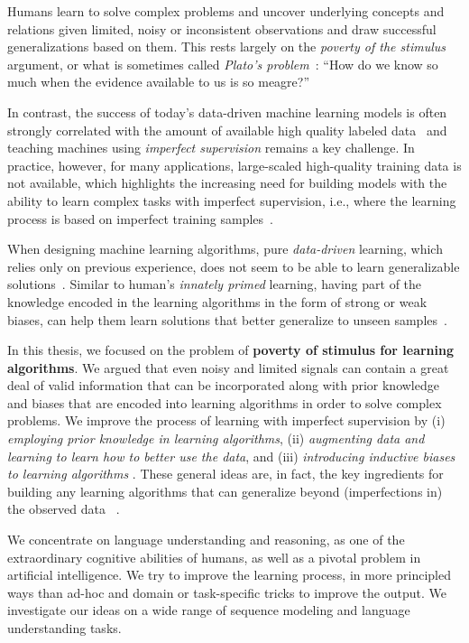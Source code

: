 \abstract
Humans learn to solve complex problems and uncover underlying concepts and relations given limited, noisy or inconsistent observations and draw successful generalizations based on them. This rests largely on the \emph{poverty of the stimulus} argument, or what is sometimes called \emph{Plato’s problem}~\citep{chomsky1986knowledge}: ``How do we know so much when the evidence available to us is so meagre?''

In contrast, the success of today's data-driven machine learning models is often strongly correlated with the amount of available high quality labeled data~\citep{halevy2009unreasonable,sun2017revisiting} and teaching machines using \emph{imperfect supervision} remains a key challenge. In practice, however, for many applications, large-scaled high-quality training data is not available, which highlights the increasing need for building models with the ability to learn complex tasks with imperfect supervision, i.e., where the learning process is based on imperfect training samples~\citep{zhou2018brief}.

When designing machine learning algorithms, pure \emph{data-driven} learning, which relies only on previous experience, does not seem to be able to learn generalizable solutions~\citep{Mitchell80theneed}. Similar to human's \emph{innately primed} learning, having part of the knowledge encoded in the learning algorithms in the form of strong or weak biases, can help them learn solutions that better generalize to unseen samples~\citep{Mitchell:1997:ML}.

In this thesis, we focused on the problem of \textbf{poverty of stimulus for learning algorithms}. We argued that even noisy and limited signals can contain a great deal of valid information that can be incorporated along with prior knowledge and biases that are encoded into learning algorithms in order to solve complex problems. We improve the process of learning with imperfect supervision by (i) \emph{employing  prior knowledge in learning algorithms}, (ii) \emph{augmenting data and learning to learn how to better use the data}, and (iii) \emph{introducing inductive biases to learning algorithms} . 
%
These general ideas are, in fact, the key ingredients for building any learning algorithms that can generalize beyond (imperfections in) the observed data ~\citep{Mitchell80theneed}.

We concentrate on language understanding and reasoning, as one of the extraordinary cognitive abilities of humans, as well as a pivotal problem in artificial intelligence. We try to improve the learning process, in more principled ways than ad-hoc and domain or task-specific tricks to improve the output. We investigate our ideas on a wide range of sequence modeling and language understanding tasks.


